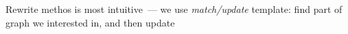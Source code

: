 
Rewrite methos is most intuitive\ ---  we use \emph{match/update} template: find
part of graph we interested in, and then update
